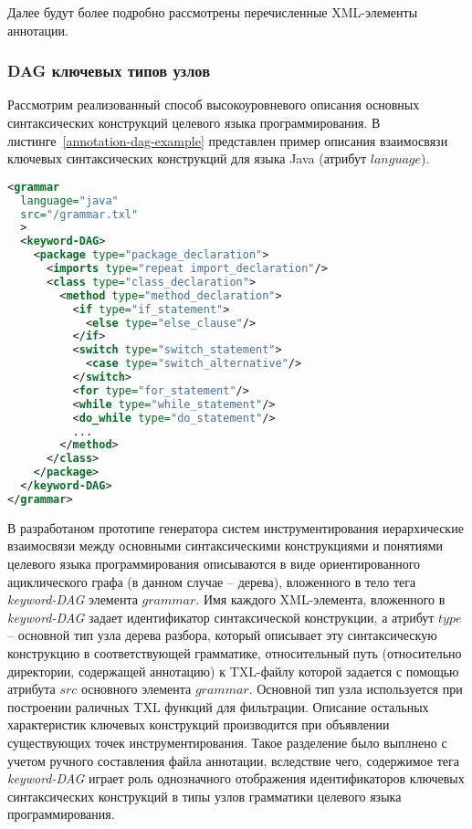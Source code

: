 
Далее будут более подробно рассмотрены перечисленные XML-элементы аннотации.

\subsubsection{DAG ключевых типов узлов}

Рассмотрим реализованный способ высокоуровневого описания основных синтаксических конструкций целевого языка программирования.
В листинге~\ref{annotation-dag-example} представлен пример описания взаимосвязи ключевых синтаксических конструкций для языка Java (атрибут $language$).

\begin{lstlisting}[frame=single, language=XML, label={annotation-dag-example}, caption={Пример DAG для грамматики языка Java.}]
<grammar
  language="java"
  src="/grammar.txl"
  >
  <keyword-DAG>
    <package type="package_declaration">
      <imports type="repeat import_declaration"/>
      <class type="class_declaration">
        <method type="method_declaration">
          <if type="if_statement">
            <else type="else_clause"/>
          </if>
          <switch type="switch_statement">
            <case type="switch_alternative"/>
          </switch>
          <for type="for_statement"/>
          <while type="while_statement"/>
          <do_while type="do_statement"/>
          ...
        </method>
      </class>
    </package>
  </keyword-DAG>
</grammar>
\end{lstlisting}

В разработаном прототипе генератора систем инструментирования иерархические взаимосвязи между основными синтаксическими конструкциями и понятиями целевого языка программирования описываются в виде ориентированного ациклического графа (в данном случае -- дерева), вложенного в тело тега \textit{keyword-DAG} элемента $grammar$.
Имя каждого XML-элемента, вложенного в \textit{keyword-DAG} задает идентификатор синтаксической конструкции, а атрибут $type$ -- основной тип узла дерева разбора, который описывает эту синтаксическую конструкцию в соответствующей грамматике, относительный путь (относительно директории, содержащей аннотацию) к TXL-файлу которой задается с помощью атрибута $src$ основного элемента $grammar$.
Основной тип узла используется при построении раличных TXL функций для фильтрации.
Описание остальных характеристик ключевых конструкций производится при объявлении существующих точек инструментирования.
Такое разделение было выплнено с учетом ручного составления файла аннотации, вследствие чего, содержимое тега \textit{keyword-DAG} играет роль однозначного отображения идентификаторов ключевых синтаксических конструкций в типы узлов грамматики целевого языка программирования.


